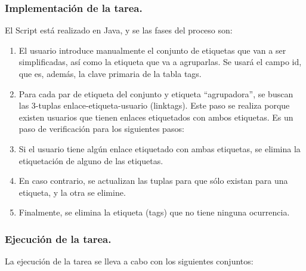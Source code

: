\subsubsection{Implementación de la tarea.}

El Script está realizado en Java, y se las fases del proceso son:
\begin{enumerate}
\item    El usuario introduce manualmente el conjunto de etiquetas que van a ser simplificadas, así como la etiqueta que va a agruparlas. Se usará el campo id, que es, además, la clave primaria de la tabla tags.
\item    Para cada par de etiqueta del conjunto y etiqueta “agrupadora”, se buscan las 3-tuplas enlace-etiqueta-usuario (linktags). Este paso se realiza porque existen usuarios que tienen enlaces etiquetados con ambos etiquetas. Es un paso de verificación para los siguientes pasos:
\item    Si el usuario tiene algún enlace etiquetado con ambas etiquetas, se elimina la etiquetación de alguno de las etiquetas.
\item    En caso contrario, se actualizan las tuplas para que sólo existan para una etiqueta, y la otra se elimine.
\item    Finalmente, se elimina la etiqueta (tags) que no tiene ninguna ocurrencia.
\end{enumerate}

\subsubsection{Ejecución de la tarea.}

La ejecución de la tarea se lleva a cabo con los siguientes conjuntos:

